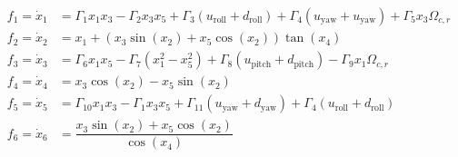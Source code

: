 \documentclass[3p]{elsarticle}
\begin{document}
\begin{align}
    f_1 = \dot{x}_1 &= \Gamma_1 x_1 x_3 - \Gamma_2 x_3 x_5 + \Gamma_3  (u_{\text{roll}} + d_{\text{roll}})
 + \Gamma_4  (u_{\text{yaw}} + u_{\text{yaw}}) 
+ \Gamma_5 x_3\Omega_{c, r}  \label{eq:eq_of_motion_start1} \\
    f_2 = \dot{x}_2 &= x_1 + (x_3\sin(x_2) + x_5\cos(x_2))\tan(x_4)  \\
    f_3 = \dot{x}_3 &= \Gamma_6 x_1 x_5 - \Gamma_7 (x_1^2 - x_5^2) + \Gamma_8  (u_{\text{pitch}} + d_{\text{pitch}})- \Gamma_9 x_1 \Omega_{c, r} \\
    f_4 = \dot{x}_4 &= x_3\cos(x_2) - x_5\sin(x_2) \\
    f_5 = \dot{x}_5 &= \Gamma_{10} x_1 x_3 - \Gamma_{1} x_3 x_5 + \Gamma_{11} (u_{\text{yaw}} + d_{\text{yaw}}) + \Gamma_{4}(u_{\text{roll}} + d_{\text{roll}})\\
    f_6 = \dot{x}_6 &= \dfrac{x_3\sin(x_2) + x_5\cos(x_2)}{\cos(x_4)}~\label{eq:eq_of_motion_end1}
\end{align}


    
\end{document}
